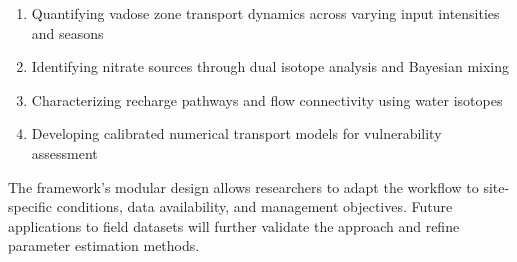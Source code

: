 \documentclass[12pt,a4paper]{article}
\begin{document}
\begin{enumerate}
	\item Quantifying vadose zone transport dynamics across varying input intensities and seasons
	\item Identifying nitrate sources through dual isotope analysis and Bayesian mixing
	\item Characterizing recharge pathways and flow connectivity using water isotopes
	\item Developing calibrated numerical transport models for vulnerability assessment
\end{enumerate}

The framework's modular design allows researchers to adapt the workflow to site-specific conditions, data availability, and management objectives. Future applications to field datasets will further validate the approach and refine parameter estimation methods.
\end{document}
